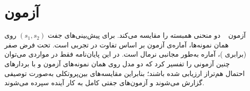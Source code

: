 \section{آزمون }

آزمون ~\cite{delong1988comparing} دو منحنی  همبسته را مقایسه می‌کند. برای پیش‌بینی‌های جفت $(s_1, s_2)$ روی همان نمونه‌ها، آماره‌ی آزمون بر اساس تفاوت در  تجربی است. تحت فرض صفر (برابری )، آماره به‌طور مجانبی نرمال است. در این پایان‌نامه فقط در مواردی می‌توان چنین آزمونی را تفسیر کرد که دو مدل روی همان نمونه‌های آزمون و با بردارهای احتمال هم‌تراز ارزیابی شده باشند؛ بنابراین مقایسه‌های بین‌پروتکلی به‌صورت توصیفی گزارش می‌شوند و آزمون‌های جفتی کامل به کار آینده سپرده می‌شوند.
